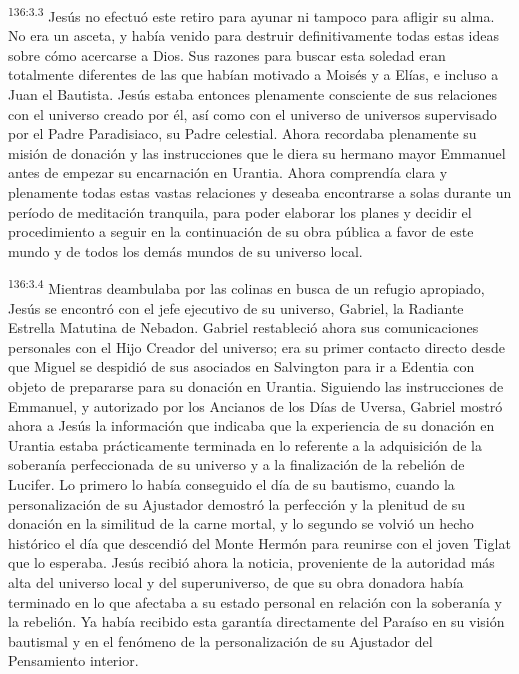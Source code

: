 \par 
\textsuperscript{136:3.3} Jesús no efectuó este retiro para ayunar ni tampoco para afligir su alma. No era un asceta, y había venido para destruir definitivamente todas estas ideas sobre cómo acercarse a Dios. Sus razones para buscar esta soledad eran totalmente diferentes de las que habían motivado a Moisés y a Elías, e incluso a Juan el Bautista. Jesús estaba entonces plenamente consciente de sus relaciones con el universo creado por él, así como con el universo de universos supervisado por el Padre Paradisiaco, su Padre celestial. Ahora recordaba plenamente su misión de donación y las instrucciones que le diera su hermano mayor Emmanuel antes de empezar su encarnación en Urantia. Ahora comprendía clara y plenamente todas estas vastas relaciones y deseaba encontrarse a solas durante un período de meditación tranquila, para poder elaborar los planes y decidir el procedimiento a seguir en la continuación de su obra pública a favor de este mundo y de todos los demás mundos de su universo local.

\par 
\textsuperscript{136:3.4} Mientras deambulaba por las colinas en busca de un refugio apropiado, Jesús se encontró con el jefe ejecutivo de su universo, Gabriel, la Radiante Estrella Matutina de Nebadon. Gabriel restableció ahora sus comunicaciones personales con el Hijo Creador del universo; era su primer contacto directo desde que Miguel se despidió de sus asociados en Salvington para ir a Edentia con objeto de prepararse para su donación en Urantia. Siguiendo las instrucciones de Emmanuel, y autorizado por los Ancianos de los Días de Uversa, Gabriel mostró ahora a Jesús la información que indicaba que la experiencia de su donación en Urantia estaba prácticamente terminada en lo referente a la adquisición de la soberanía perfeccionada de su universo y a la finalización de la rebelión de Lucifer. Lo primero lo había conseguido el día de su bautismo, cuando la personalización de su Ajustador demostró la perfección y la plenitud de su donación en la similitud de la carne mortal, y lo segundo se volvió un hecho histórico el día que descendió del Monte Hermón para reunirse con el joven Tiglat que lo esperaba. Jesús recibió ahora la noticia, proveniente de la autoridad más alta del universo local y del superuniverso, de que su obra donadora había terminado en lo que afectaba a su estado personal en relación con la soberanía y la rebelión. Ya había recibido esta garantía directamente del Paraíso en su visión bautismal y en el fenómeno de la personalización de su Ajustador del Pensamiento interior.


